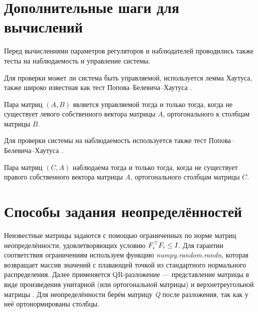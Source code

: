 \chapter{Дополнительные шаги для вычислений}\label{app:B}

Перед вычислениями параметров регуляторов и наблюдателей проводились также тесты на наблюдаемость и управление системы. 

Для проверки может ли система быть управляемой, используется лемма Хаутуса, также широко известная как тест Попова--Белевича--Хаутуса \cite{bernstein2018scalar}.
\begin{lemma}
	Пара матриц $(A, B)$ является управляемой тогда и только тогда, когда не существует левого собственного вектора матрицы $A$, ортогонального к столбцам матрицы $B$.
\end{lemma}

Для проверки системы на наблюдаемость используется также тест Попова--Белевича--Хаутуса \cite{Sontag1998}.

\begin{lemma}
	Пара матриц $(C, A)$ наблюдаема тогда и только тогда, когда не существует правого собственного вектора матрицы $A$, ортогонального столбцам матрицы $C$.
\end{lemma}

\chapter{Способы задания неопределённостей}\label{app:С}
	
Неизвестные матрицы задаются с помощью ограниченных по норме матриц неопределённости, удовлетворяющих условию ${F}_i^\top{F}_i\leq {I}$. Для гарантии соответствия ограничениям используем функцию \textit{numpy.random.randn}, которая возвращает массив значений с плавающей точкой из стандартного нормального распределения. Далее применяется QR-разложение --- представление матрицы в виде произведения унитарной (или ортогональной матрицы) и верхнетреугольной матрицы \cite{horn1990matrix}. Для неопределённости берём матрицу \textit{Q} после разложения, так как у неё ортонормированы столбцы.

\begin{comment}
\begin{ListingEnv}[!h]	
\captiondelim{ } %
\caption{Программа задания неопределённости}\label{lst:delta}
	\begin{Verb}
		import numpy as np
		
		# dim_Delta - размерность матрицы F
		Random_matrix = np.random.randn(dim_Delta, dim_Delta)
		# QR-декомпозиция, Q матрица с ортонормированными столбцами
		F, _ = np.linalg.qr(Random_matrix)
	\end{Verb}
\end{ListingEnv}
\end{comment}